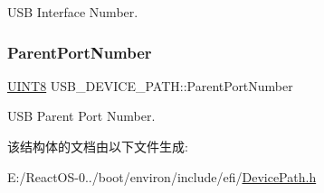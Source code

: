 U\+SB Interface Number. \mbox{\label{struct_u_s_b___d_e_v_i_c_e___p_a_t_h_a12abab139520e2caae8357b7b2dbb364}} 
\subsubsection{\texorpdfstring{Parent\+Port\+Number}{ParentPortNumber}}
{\footnotesize\ttfamily \hyperlink{_processor_bind_8h_ab27e9918b538ce9d8ca692479b375b6a}{U\+I\+N\+T8} U\+S\+B\+\_\+\+D\+E\+V\+I\+C\+E\+\_\+\+P\+A\+T\+H\+::\+Parent\+Port\+Number}

U\+SB Parent Port Number. 

该结构体的文档由以下文件生成\+:\begin{DoxyCompactItemize}
\item 
E\+:/\+React\+O\+S-\/0../boot/environ/include/efi/\hyperlink{_device_path_8h}{Device\+Path.\+h}\end{DoxyCompactItemize}
